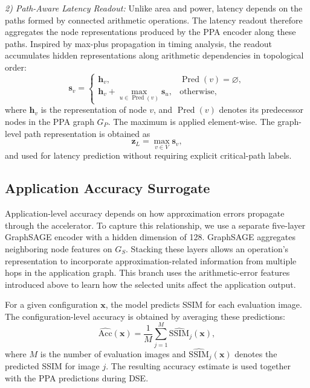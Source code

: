 \noindent\textit{2) Path-Aware Latency Readout:}
Unlike area and power, latency depends on the paths formed by connected arithmetic operations. The latency readout therefore aggregates the node representations produced by the PPA encoder along these paths. Inspired by max-plus propagation in timing analysis, the readout accumulates hidden representations along arithmetic dependencies in topological order:
\begin{equation}
\mathbf{s}_v=
\begin{cases}
\mathbf{h}_v, & \operatorname{Pred}(v)=\varnothing,\\
\mathbf{h}_v+\displaystyle\max_{u\in\operatorname{Pred}(v)}
\mathbf{s}_u, & \text{otherwise},
\end{cases}
\label{eq:se_path_aggregation}
\end{equation}
where $\mathbf{h}_v$ is the representation of node $v$, and $\operatorname{Pred}(v)$ denotes its predecessor nodes in the PPA graph $G_P$. The maximum is applied element-wise. The graph-level path representation is obtained as
\begin{equation}
    \mathbf{z}_L=\max_{v\in V}\mathbf{s}_v,
\end{equation}
and used for latency prediction without requiring explicit critical-path labels.

\subsection{Application Accuracy Surrogate}
\label{subsec:accuracy}

Application-level accuracy depends on how approximation errors propagate through the accelerator. To capture this relationship, we use a separate five-layer GraphSAGE encoder with a hidden dimension of 128. GraphSAGE aggregates neighboring node features on $G_S$. Stacking these layers allows an operation's representation to incorporate approximation-related information from multiple hops in the application graph. This branch uses the arithmetic-error features introduced above to learn how the selected units affect the application output.

For a given configuration $\mathbf{x}$, the model predicts SSIM for each evaluation image. The configuration-level accuracy is obtained by averaging these predictions:
\begin{equation}
    \widehat{\mathrm{Acc}}(\mathbf{x})
    =
    \frac{1}{M}
    \sum_{j=1}^{M}
    \widehat{\mathrm{SSIM}}_j(\mathbf{x}),
    \label{eq:se_accuracy_prediction}
\end{equation}
where $M$ is the number of evaluation images and $\widehat{\mathrm{SSIM}}_j(\mathbf{x})$ denotes the predicted SSIM for image $j$. The resulting accuracy estimate is used together with the PPA predictions during DSE.

